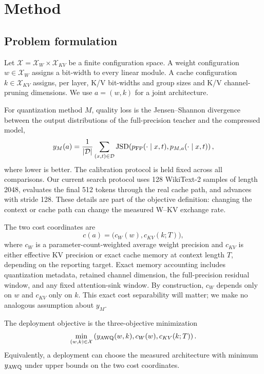 \section{Method}
\label{sec:method}

\subsection{Problem formulation}
\label{sec:problem}

Let $\mathcal{X}=\mathcal{X}_W\times\mathcal{X}_{KV}$ be a finite configuration
space.  A weight configuration $w\in\mathcal{X}_W$ assigns a bit-width to every
linear module.  A cache configuration $k\in\mathcal{X}_{KV}$ assigns, per layer,
K/V bit-widths and group sizes and K/V channel-pruning dimensions.  We use
$a=(w,k)$ for a joint architecture.

For quantization method $M$, quality loss is the Jensen--Shannon divergence
between the output distributions of the full-precision teacher and the
compressed model,
\begin{equation}
  y_M(a)=\frac{1}{|\mathcal{D}|}
  \sum_{(x,t)\in\mathcal{D}}
  \operatorname{JSD}\!\left(p_{\mathrm{FP}}(\cdot\mid x,t),
              p_{M,a}(\cdot\mid x,t)\right),
  \label{eq:jsd}
\end{equation}
where lower is better.  The calibration protocol is held fixed across all
comparisons.  Our current search protocol uses 128 WikiText-2 samples of length
2048, evaluates the final 512 tokens through the real cache path, and advances
with stride 128.  These details are part of the objective definition: changing
the context or cache path can change the measured W--KV exchange rate.

The two cost coordinates are
\begin{equation}
  c(a)=\big(c_W(w),c_{KV}(k;T)\big),
  \label{eq:cost}
\end{equation}
where $c_W$ is a parameter-count-weighted average weight precision and $c_{KV}$
is either effective KV precision or exact cache memory at context length $T$,
depending on the reporting target.  Exact memory accounting includes
quantization metadata, retained channel dimension,
the full-precision residual window, and any fixed attention-sink window.  By
construction, $c_W$ depends only on $w$ and $c_{KV}$ only on $k$.  This exact cost
separability will matter; we make no analogous assumption about $y_M$.

The deployment objective is the three-objective minimization
\begin{equation}
  \min_{(w,k)\in\mathcal{X}}
  \left(y_{\mathrm{AWQ}}(w,k),c_W(w),c_{KV}(k;T)\right).
  \label{eq:moo}
\end{equation}
Equivalently, a deployment can choose the measured architecture with minimum
$y_{\mathrm{AWQ}}$ under upper bounds on the two cost coordinates.

